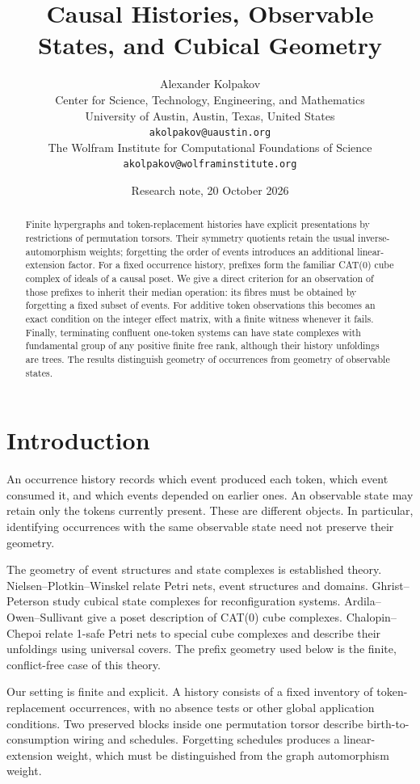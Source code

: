 \documentclass[11pt]{article}
\title{Causal Histories, Observable States, and Cubical Geometry}
\author{Alexander Kolpakov\\[0.5ex]
\small Center for Science, Technology, Engineering, and Mathematics\\
\small University of Austin, Austin, Texas, United States\\
\small \texttt{akolpakov@uaustin.org}\\[0.75ex]
\small The Wolfram Institute for Computational Foundations of Science\\
\small \texttt{akolpakov@wolframinstitute.org}}
\date{Research note, 20 October 2026}
\theoremstyle{definition}
\numberwithin{equation}{section}
\begin{document}
\maketitle
\begin{abstract}
Finite hypergraphs and token-replacement histories have explicit
presentations by restrictions of permutation torsors. Their symmetry
quotients retain the usual inverse-automorphism weights; forgetting
the order of events introduces an additional linear-extension factor.
For a fixed occurrence history, prefixes form the familiar CAT(0)
cube complex of ideals of a causal poset. We give a direct criterion
for an observation of those prefixes to inherit their median operation:
its fibres must be obtained by forgetting a fixed subset of events.
For additive token observations this becomes an exact condition on
the integer effect matrix, with a finite witness whenever it fails.
Finally, terminating confluent one-token systems can have state
complexes with fundamental group of any positive finite free rank, although
their history unfoldings are trees. The results distinguish geometry
of occurrences from geometry of observable states.
\end{abstract}

\section{Introduction}
An occurrence history records which event produced each token, which
event consumed it, and which events depended on earlier ones.
An observable state may retain only the tokens currently present.
These are different objects. In particular, identifying occurrences
with the same observable state need not preserve their geometry.

The geometry of event structures and state complexes is established
theory. Nielsen--Plotkin--Winskel \cite{NPW} relate Petri nets,
event structures and domains. Ghrist--Peterson \cite{GP} study cubical
state complexes for reconfiguration systems. Ardila--Owen--Sullivant
\cite[Section 2]{AOS} give a poset description of CAT(0) cube complexes.
Chalopin--Chepoi \cite[Sections 3 and 8]{CC} relate 1-safe Petri nets
to special cube complexes and describe their unfoldings using
universal covers. The prefix geometry used below is the finite,
conflict-free case of this theory.

Our setting is finite and explicit. A history consists of a fixed
inventory of token-replacement occurrences, with no absence tests or
other global application conditions. Two preserved blocks inside one
permutation torsor describe birth-to-consumption wiring and schedules.
Forgetting schedules produces a linear-extension weight, which must
be distinguished from the graph automorphism weight.
\end{document}

